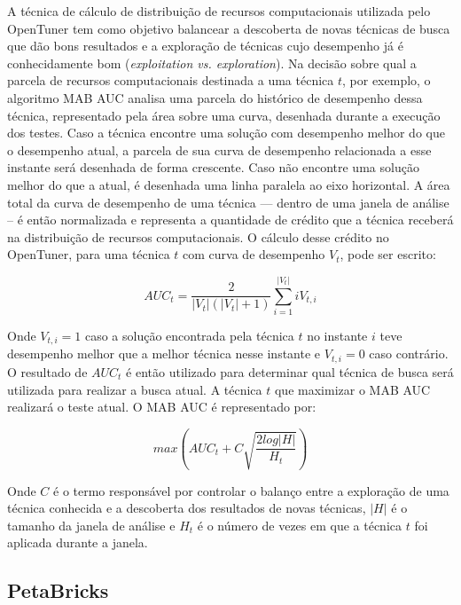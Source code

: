 \documentclass[a4paper, 12pt]{article}
\begin{document}
A técnica de cálculo de distribuição de recursos computacionais utilizada
pelo OpenTuner tem como objetivo balancear a descoberta de novas técnicas
de busca que dão bons resultados e a exploração de técnicas cujo desempenho
já é conhecidamente bom (\emph{exploitation vs. exploration}). Na decisão sobre
qual a parcela de recursos computacionais destinada a uma técnica $t$, por
exemplo, o algoritmo MAB AUC analisa uma parcela do histórico de desempenho 
dessa técnica, representado pela área sobre uma curva, desenhada durante a
execução dos testes. Caso a técnica encontre uma solução com desempenho melhor
do que o desempenho atual, a parcela de sua curva de desempenho relacionada a
esse instante será desenhada de forma crescente. Caso não encontre uma solução
melhor do que a atual, é desenhada uma linha paralela ao eixo horizontal. A
área total da curva de desempenho de uma técnica --- dentro de uma janela de
análise -- é então normalizada e representa a quantidade de crédito que a 
técnica receberá na distribuição de recursos computacionais. O cálculo desse 
crédito no OpenTuner, para uma técnica $t$ com curva de desempenho $V_t$, pode
ser escrito:

\begin{equation*}
    AUC_t = \frac{2} {|V_t|(|V_t|+1)} \sum_{i=1}^{|V_t|} iV_{t,i}
\end{equation*}

Onde $V_{t,i} = 1$ caso a solução encontrada pela técnica $t$ no instante
$i$ teve desempenho melhor que a melhor técnica nesse instante e 
$V_{t,i} = 0$ caso contrário. O resultado de $AUC_t$ é então utilizado para
determinar qual técnica de busca será utilizada para realizar a busca atual.
A técnica $t$ que maximizar o MAB AUC realizará o teste atual. O MAB AUC é
representado por:

\begin{equation*}
    max \left( AUC_t + C\sqrt{\frac{2log|H|}{H_t}} \right)
\end{equation*}

Onde $C$ é o termo responsável por controlar o balanço entre a exploração de 
uma técnica conhecida e a descoberta dos resultados de novas técnicas, $|H|$ é
o tamanho da janela de análise e $H_t$ é o número de vezes em que a técnica $t$
foi aplicada durante a janela.

\subsection{PetaBricks} \label{sec:peta}
\end{document}
